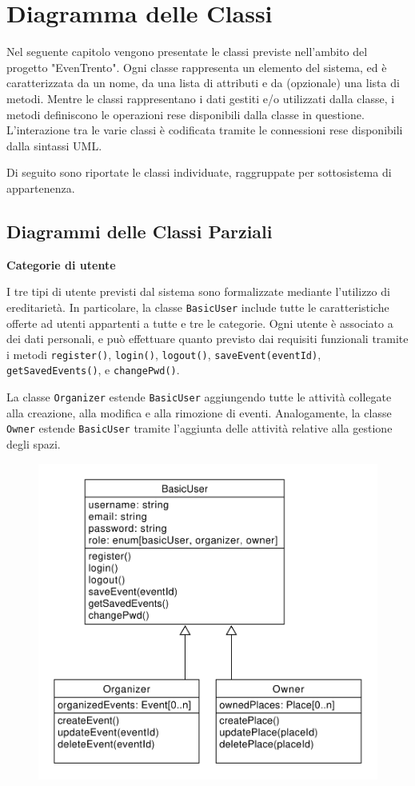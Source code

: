 \documentclass[9pt]{extarticle}
\begin{document}
\newpage

\section{Diagramma delle Classi}

Nel seguente capitolo vengono presentate le classi previste nell'ambito del progetto "EvenTrento". Ogni classe rappresenta un elemento del sistema, ed è caratterizzata da un nome, da una lista di attributi e da (opzionale) una lista di metodi.
Mentre le classi rappresentano i dati gestiti e/o utilizzati dalla classe, i metodi definiscono le operazioni rese disponibili dalla classe in questione. L'interazione tra le varie classi è codificata tramite le connessioni rese disponibili dalla sintassi UML.

Di seguito sono riportate le classi individuate, raggruppate per sottosistema di appartenenza.

\subsection{Diagrammi delle Classi Parziali}

\textbf{Categorie di utente}


I tre tipi di utente previsti dal sistema sono formalizzate mediante l'utilizzo di ereditarietà. In particolare, la classe \verb*|BasicUser| include tutte le caratteristiche offerte ad utenti appartenti a tutte e tre le categorie. Ogni utente è associato a dei dati personali, e può effettuare quanto previsto dai requisiti funzionali tramite i metodi \verb*|register()|, \verb*|login()|, \verb*|logout()|, \verb*|saveEvent(eventId)|, \verb*|getSavedEvents()|, e \verb*|changePwd()|.


La classe \verb*|Organizer| estende \verb*|BasicUser| aggiungendo tutte le attività collegate alla creazione, alla modifica e alla rimozione di eventi. Analogamente, la classe \verb*|Owner| estende \verb*|BasicUser| tramite l'aggiunta delle attività relative alla gestione degli spazi.

\begin{figure}[!htb]
	\centering
	\includegraphics[width=.6\linewidth]{./images/classDiagramUsers.pdf}
		\caption{}
	\label{fig:classDiagramUsers}
\end{figure}
\end{document}
